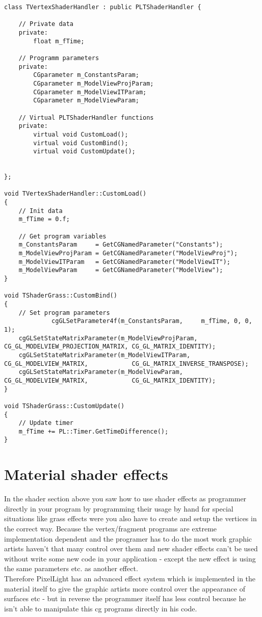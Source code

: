 \begin{lstlisting}[caption=Creating own shader handler]
class TVertexShaderHandler : public PLTShaderHandler {

    // Private data
    private:
        float m_fTime;

    // Programm parameters
    private:
        CGparameter m_ConstantsParam;
        CGparameter m_ModelViewProjParam;
        CGparameter m_ModelViewITParam;
        CGparameter m_ModelViewParam;

    // Virtual PLTShaderHandler functions
    private:
        virtual void CustomLoad();
        virtual void CustomBind();
        virtual void CustomUpdate();


};

void TVertexShaderHandler::CustomLoad()
{
    // Init data
    m_fTime = 0.f;

    // Get program variables
    m_ConstantsParam     = GetCGNamedParameter("Constants");
    m_ModelViewProjParam = GetCGNamedParameter("ModelViewProj");
    m_ModelViewITParam   = GetCGNamedParameter("ModelViewIT");
    m_ModelViewParam     = GetCGNamedParameter("ModelView");
}

void TShaderGrass::CustomBind()
{
    // Set program parameters
             cgGLSetParameter4f(m_ConstantsParam,     m_fTime, 0, 0, 1);
    cgGLSetStateMatrixParameter(m_ModelViewProjParam, CG_GL_MODELVIEW_PROJECTION_MATRIX, CG_GL_MATRIX_IDENTITY);
    cgGLSetStateMatrixParameter(m_ModelViewITParam,   CG_GL_MODELVIEW_MATRIX,            CG_GL_MATRIX_INVERSE_TRANSPOSE);
    cgGLSetStateMatrixParameter(m_ModelViewParam,     CG_GL_MODELVIEW_MATRIX,            CG_GL_MATRIX_IDENTITY);
}

void TShaderGrass::CustomUpdate()
{
    // Update timer
    m_fTime += PL::Timer.GetTimeDifference();
}
\end{lstlisting}




\section{Material shader effects}
In the shader section above you saw how to use shader effects as programmer directly in your program
by programming their usage by hand for special situations like grass effects were you also have to
create and setup the vertices in the correct way.
Because the vertex/fragment programs are extreme implementation dependent and the programer has to
do the most work graphic artists haven't that many control over them and new shader effects can't be
used without write some new code in your application - except the new effect is using the same parameters
etc. as another effect.\\
Therefore PixelLight has an advanced effect system which is implemented in the material itself to give the
graphic artists more control over the appearance of  surfaces etc - but in reverse the programmer
itself has less control because he isn't able to manipulate this cg programs directly in his code.\\




